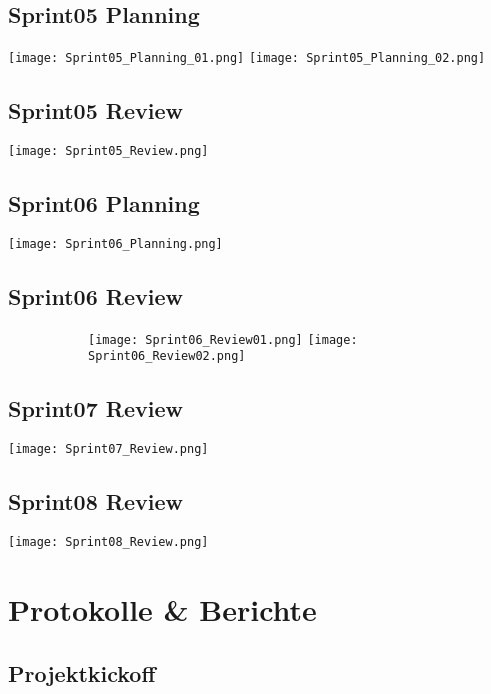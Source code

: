 \newpage
\section*{Sprint05 Planning}
\texttt{[image: Sprint05\_Planning\_01.png]}
\newpage
\noindent
\texttt{[image: Sprint05\_Planning\_02.png]}

\newpage
\section*{Sprint05 Review}
\texttt{[image: Sprint05\_Review.png]}

\newpage
\section*{Sprint06 Planning}
\texttt{[image: Sprint06\_Planning.png]}

\newpage
\section*{Sprint06 Review}

\begin{figure}[h!]
	\begin{subfigure}{\linewidth}
		\texttt{[image: Sprint06\_Review01.png]}
		\texttt{[image: Sprint06\_Review02.png]}
	\end{subfigure}
\end{figure}

\newpage
\section*{Sprint07 Review}
\texttt{[image: Sprint07\_Review.png]}

\newpage
\section*{Sprint08 Review}
\texttt{[image: Sprint08\_Review.png]}

\chapter{Protokolle \& Berichte}
\section{Projektkickoff}
\label{app:sec:protokollKickoff}


